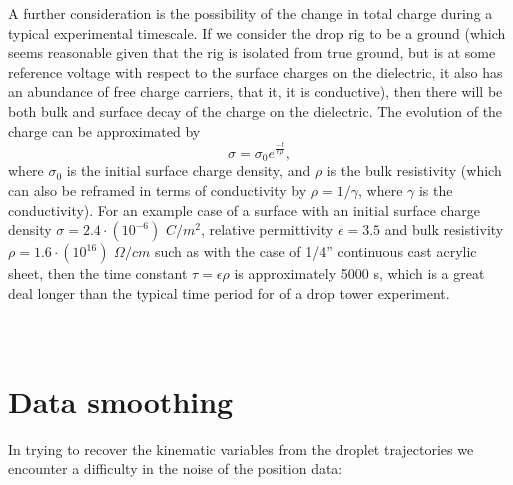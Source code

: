 \documentclass{jfm}
\begin{document}
A further consideration is the possibility of the change in total charge during a typical experimental timescale. If we consider the drop rig to be a ground (which seems reasonable given that the rig is isolated from true ground, but is at some reference voltage with respect to the surface charges on the dielectric, it also has an abundance of free charge carriers, that it, it is conductive), then there will be both bulk and surface decay of the charge on the dielectric. The evolution of the charge can be approximated by
\[ \sigma = \sigma_0 e^{\frac{-t}{\epsilon \rho}}, \]
where $\sigma_0$ is the initial surface charge density, and $\rho$ is the bulk resistivity (which can also be reframed in terms of conductivity by $\rho = 1/\gamma$, where $\gamma$ is the conductivity). For an example case of a surface with an initial surface charge density $\sigma = 2.4 \cdot (10^{-6})$ $C/m^2$, relative permittivity $\epsilon = 3.5$ and bulk resistivity $\rho = 1.6 \cdot (10^{16})$ $\Omega/cm$ such as with the case of 1/4'' continuous cast acrylic sheet, then the time constant $\tau = \epsilon \rho$ is approximately 5000 s, which is a great deal longer than the typical time period for of a drop tower experiment.

\section{\\Data smoothing}
In trying to recover the kinematic variables from the droplet trajectories we encounter a difficulty in the noise of the position data:
\end{document}
